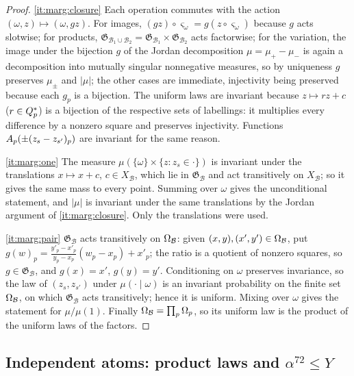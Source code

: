 \begin{proof}
\ref{it:marg:closure} Each operation commutes with the action
$(\omega,z)\mapsto(\omega,gz)$. For images, $(gz)\circ\varsigma_\omega=g(z\circ\varsigma_\omega)$
because $g$ acts slotwise; for products,
$\mathfrak G_{\mathcal B_1\cup\mathcal B_2}=\mathfrak G_{\mathcal B_1}\times\mathfrak G_{\mathcal B_2}$
acts factorwise; for the variation, the image under the bijection $g$ of the
Jordan decomposition $\mu=\mu_+-\mu_-$ is again a decomposition into mutually
singular nonnegative measures, so by uniqueness $g$ preserves $\mu_\pm$ and
$|\mu|$; the other cases are immediate, injectivity being preserved because
each $g_p$ is a bijection. The uniform laws are invariant because
$z\mapsto rz+c$ ($r\in\Qsq$) is a bijection of the respective sets of
labellings: it multiplies every difference by a nonzero square and preserves
injectivity. Functions $\Ap(\pm(z_s-z_{s'})_p)$ are invariant for the same
reason.

\ref{it:marg:one} The measure $\mu(\{\omega\}\times\{z:z_s\in\cdot\})$ is
invariant under the translations $x\mapsto x+c$, $c\in X_{\mathcal B}$, which
lie in $\mathfrak G_{\mathcal B}$ and act transitively on $X_{\mathcal B}$; so it
gives the same mass to every point. Summing over $\omega$ gives the
unconditional statement, and $|\mu|$ is invariant under the same translations
by the Jordan argument of \ref{it:marg:closure}. Only the translations were
used.

\ref{it:marg:pair} $\mathfrak G_{\mathcal B}$ acts transitively on $\Om[\mathcal B]$:
given $(x,y),(x',y')\in\Om[\mathcal B]$, put
$g(w)_p=\frac{y'_p-x'_p}{y_p-x_p}(w_p-x_p)+x'_p$; the ratio is a quotient of
nonzero squares, so $g\in\mathfrak G_{\mathcal B}$, and $g(x)=x'$, $g(y)=y'$.
Conditioning on $\omega$ preserves invariance, so the law of $(z_s,z_{s'})$
under $\mu(\cdot\mid\omega)$ is an invariant probability on the finite set
$\Om[\mathcal B]$, on which $\mathfrak G_{\mathcal B}$ acts transitively; hence it is
uniform. Mixing over $\omega$ gives the statement for $\mu/\mu(1)$. Finally
$\Om[\mathcal B]=\prod_p\Om$, so its uniform law is the product of the uniform
laws of the factors.
\end{proof}

\subsection{Independent atoms: product laws and \texorpdfstring{$\alpha^{72}\le Y$}{alpha\textasciicircum 72 <= Y}}\label{subsec:pos:products}

